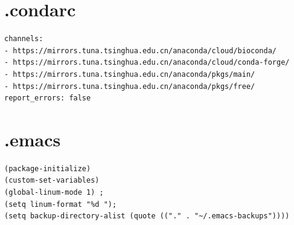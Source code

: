 \documentclass[]{article}
\begin{document}
\section{.condarc}
\begin{verbatim}
channels:
- https://mirrors.tuna.tsinghua.edu.cn/anaconda/cloud/bioconda/
- https://mirrors.tuna.tsinghua.edu.cn/anaconda/cloud/conda-forge/
- https://mirrors.tuna.tsinghua.edu.cn/anaconda/pkgs/main/
- https://mirrors.tuna.tsinghua.edu.cn/anaconda/pkgs/free/
report_errors: false
\end{verbatim}

\section{.emacs}
\begin{verbatim}
(package-initialize)
(custom-set-variables)
(global-linum-mode 1) ;
(setq linum-format "%d ");
(setq backup-directory-alist (quote (("." . "~/.emacs-backups"))))
\end{verbatim}
\end{document}
